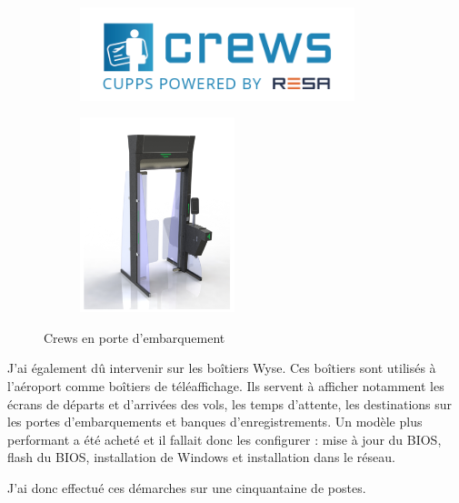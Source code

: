 \begin{figure}[hbt!]
  \begin{subfigure}{0.5\textwidth}
    \centering
    \includegraphics[width=8cm]{Images/logocrews.png}  
    \label{fig:logocrews}
  \end{subfigure}
  \begin{subfigure}{0.5\textwidth}
    \centering
    \includegraphics[width=4.5cm]{Images/crews2.png}\newline  
    \label{fig:portecrews}
  \end{subfigure}
  \caption{Crews en porte d'embarquement}
\end{figure}


J’ai également dû intervenir sur les boîtiers Wyse. Ces boîtiers sont utilisés à l’aéroport comme boîtiers de téléaffichage. Ils servent à afficher notamment les écrans de départs et d’arrivées des vols, les temps d’attente, les destinations sur les portes d’embarquements et banques d'enregistrements. Un modèle plus performant a été acheté et il fallait donc les configurer : mise à jour du BIOS, flash du BIOS, installation de Windows et installation dans le réseau.


J’ai donc effectué ces démarches sur une cinquantaine de postes.\newline

